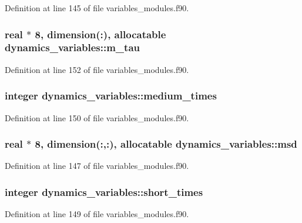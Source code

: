 Definition at line 145 of file variables\+\_\+modules.\+f90.

\subsubsection[{\texorpdfstring{m\+\_\+tau}{m_tau}}]{\setlength{\rightskip}{0pt plus 5cm}real $\ast$ 8, dimension(\+:), allocatable dynamics\+\_\+variables\+::m\+\_\+tau}\hypertarget{namespacedynamics__variables_a3bba8f0483c8ea097be9ffbcd0ccbdc5}{}\label{namespacedynamics__variables_a3bba8f0483c8ea097be9ffbcd0ccbdc5}


Definition at line 152 of file variables\+\_\+modules.\+f90.

\subsubsection[{\texorpdfstring{medium\+\_\+times}{medium_times}}]{\setlength{\rightskip}{0pt plus 5cm}integer dynamics\+\_\+variables\+::medium\+\_\+times}\hypertarget{namespacedynamics__variables_a12f963fbaf3733c50be7b2eb013133f6}{}\label{namespacedynamics__variables_a12f963fbaf3733c50be7b2eb013133f6}


Definition at line 150 of file variables\+\_\+modules.\+f90.

\subsubsection[{\texorpdfstring{msd}{msd}}]{\setlength{\rightskip}{0pt plus 5cm}real $\ast$ 8, dimension(\+:,\+:), allocatable dynamics\+\_\+variables\+::msd}\hypertarget{namespacedynamics__variables_a11b1153d883a50528bc1843306c887fe}{}\label{namespacedynamics__variables_a11b1153d883a50528bc1843306c887fe}


Definition at line 147 of file variables\+\_\+modules.\+f90.

\subsubsection[{\texorpdfstring{short\+\_\+times}{short_times}}]{\setlength{\rightskip}{0pt plus 5cm}integer dynamics\+\_\+variables\+::short\+\_\+times}\hypertarget{namespacedynamics__variables_ae4ed48f39cb51ae5223de16688bf98dc}{}\label{namespacedynamics__variables_ae4ed48f39cb51ae5223de16688bf98dc}


Definition at line 149 of file variables\+\_\+modules.\+f90.

